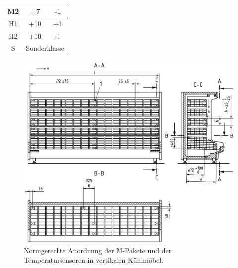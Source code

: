 \begin{table}[h!]
\begin{tabular}{|c|c|c|}
M2              & +7                                                                                                                         & -1                                                                                                                         \\ \hline
H1              & +10                                                                                                                        & +1                                                                                                                         \\ \hline
H2              & +10                                                                                                                        & -1                                                                                                                         \\ \hline
S               & \multicolumn{2}{c|}{Sonderklasse}                                                                                                                                                                                                                       \\ \hline
\end{tabular}
\end{table}

\clearpage

\begin{figure}[h!tb]
\centering
\includegraphics[scale=.11]{Pictures/multi-deck-chilled-cabinet.pdf}
\caption{Normgerechte Anordnung der M-Pakete und der Temperatursensoren in vertikalen Kühlmöbel.}
\label{fig:Anordnung der M-Pakete}
\end{figure}







